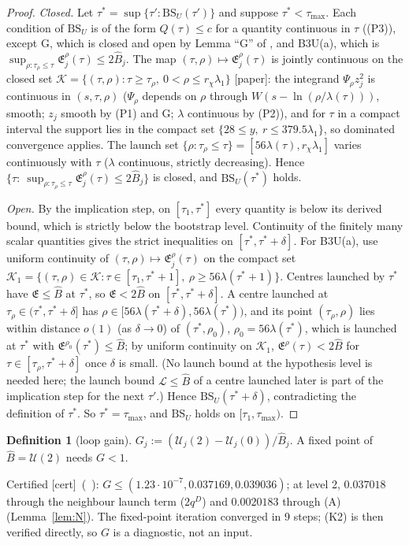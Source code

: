 \documentclass[11pt]{article}
\theoremstyle{definition}\newtheorem{definition}[theorem]{Definition}
\theoremstyle{remark}\newtheorem{remark}[theorem]{Remark}
\newcommand{\fn}[1]{\texttt{\detokenize{#1}}}
\newcommand{\key}[1]{\texttt{\detokenize{#1}}}
\newcommand{\tC}{\textup{[cert]}}\newcommand{\tP}{\textup{[paper]}}\newcommand{\tH}{\textup{[hyp]}}\newcommand{\tE}{\textup{[est]}}
\newcommand{\E}{\mathfrak E}\newcommand{\B}{\mathfrak B}\newcommand{\Bh}{\hat B}\newcommand{\Eh}{\hat E^A}
\begin{document}
\begin{proof}
\emph{Closed.} Let $\tau^*=\sup\{\tau':\mathrm{BS}_U(\tau')\}$ and suppose $\tau^*<\tau_{\max}$. Each condition of $\mathrm{BS}_U$ is of the form $Q(\tau)\le c$ for a quantity continuous in $\tau$ ((P3)), except G, which is closed and open by Lemma ``G'' of \fn{continuation_v33.tex}, and B3U(a), which is $\sup_{\rho:\tau_\rho\le\tau}\E^\rho_j(\tau)\le2\Bh_j$. The map $(\tau,\rho)\mapsto\E^\rho_j(\tau)$ is jointly continuous on the closed set $\mathcal K=\{(\tau,\rho):\tau\ge\tau_\rho,\ 0<\rho\le r_\chi\lambda_1\}$ \tP: the integrand $\Psi_\rho z_j^2$ is continuous in $(s,\tau,\rho)$ ($\Psi_\rho$ depends on $\rho$ through $W(s-\ln(\rho/\lambda(\tau)))$, smooth; $z_j$ smooth by (P1) and G; $\lambda$ continuous by (P2)), and for $\tau$ in a compact interval the support lies in the compact set $\{28\le y,\ r\le379.5\lambda_1\}$, so dominated convergence applies. The launch set $\{\rho:\tau_\rho\le\tau\}=[56\lambda(\tau),r_\chi\lambda_1]$ varies continuously with $\tau$ ($\lambda$ continuous, strictly decreasing). Hence $\{\tau:\ \sup_{\rho:\tau_\rho\le\tau}\E^\rho_j(\tau)\le2\Bh_j\}$ is closed, and $\mathrm{BS}_U(\tau^*)$ holds.

\emph{Open.} By the implication step, on $[\tau_1,\tau^*]$ every quantity is below its derived bound, which is strictly below the bootstrap level. Continuity of the finitely many scalar quantities gives the strict inequalities on $[\tau^*,\tau^*+\delta]$. For B3U(a), use uniform continuity of $(\tau,\rho)\mapsto\E^\rho_j(\tau)$ on the compact set $\mathcal K_1=\{(\tau,\rho)\in\mathcal K:\tau\in[\tau_1,\tau^*+1],\ \rho\ge56\lambda(\tau^*+1)\}$. Centres launched by $\tau^*$ have $\E\le\Bh$ at $\tau^*$, so $\E<2\Bh$ on $[\tau^*,\tau^*+\delta]$. A centre launched at $\tau_\rho\in(\tau^*,\tau^*+\delta]$ has $\rho\in[56\lambda(\tau^*+\delta),56\lambda(\tau^*))$, and its point $(\tau_\rho,\rho)$ lies within distance $o(1)$ (as $\delta\to0$) of $(\tau^*,\rho_0)$, $\rho_0=56\lambda(\tau^*)$, which is launched at $\tau^*$ with $\E^{\rho_0}(\tau^*)\le\Bh$; by uniform continuity on $\mathcal K_1$, $\E^\rho(\tau)<2\Bh$ for $\tau\in[\tau_\rho,\tau^*+\delta]$ once $\delta$ is small. (No launch bound at the hypothesis level is needed here; the launch bound $\mathcal L\le\Bh$ of a centre launched later is part of the implication step for the next $\tau'$.) Hence $\mathrm{BS}_U(\tau^*+\delta)$, contradicting the definition of $\tau^*$. So $\tau^*=\tau_{\max}$, and $\mathrm{BS}_U$ holds on $[\tau_1,\tau_{\max})$.
\end{proof}

\begin{definition}[loop gain]\label{def:gain}
$G_j:=(\mathcal U_j(2)-\mathcal U_j(0))/\Bh_j$. A fixed point of $\Bh=\mathcal U(2)$ needs $G<1$.
\end{definition}
\noindent Certified \tC\ (\SU\ \key{loop_gain}): $G\le(1.23\cdot10^{-7},0.037169,0.039036)$; at level 2, $0.037018$ through the neighbour launch term ($2q^D$) and $0.0020183$ through (A) (Lemma~\ref{lem:N}). The fixed-point iteration converged in 9 steps; (K2) is then verified directly, so $G$ is a diagnostic, not an input.
\end{document}
